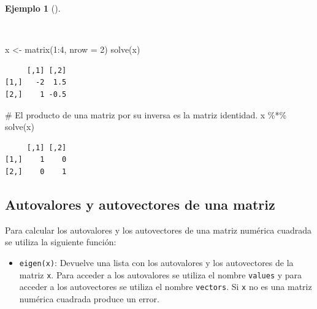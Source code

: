 \documentclass[
  spanish,
  a4paper,
]{scrreport}
\newenvironment{Shaded}{\begin{snugshade}}{\end{snugshade}}
\newcommand{\AttributeTok}[1]{\textcolor[rgb]{0.40,0.45,0.13}{#1}}
\newcommand{\CommentTok}[1]{\textcolor[rgb]{0.37,0.37,0.37}{#1}}
\newcommand{\DecValTok}[1]{\textcolor[rgb]{0.68,0.00,0.00}{#1}}
\newcommand{\FunctionTok}[1]{\textcolor[rgb]{0.28,0.35,0.67}{#1}}
\newcommand{\NormalTok}[1]{\textcolor[rgb]{0.00,0.23,0.31}{#1}}
\newcommand{\OtherTok}[1]{\textcolor[rgb]{0.00,0.23,0.31}{#1}}
\newcommand{\SpecialCharTok}[1]{\textcolor[rgb]{0.37,0.37,0.37}{#1}}
\providecommand{\tightlist}{%
  \setlength{\itemsep}{0pt}\setlength{\parskip}{0pt}}
\theoremstyle{definition}
\theoremstyle{definition}
\newtheorem{example}{Ejemplo}[chapter]
\theoremstyle{remark}
\begin{document}
\begin{example}[]\protect\hypertarget{exm-inversa-matriz}{}\label{exm-inversa-matriz}

~

\begin{Shaded}
\begin{Highlighting}[]
\NormalTok{x }\OtherTok{\textless{}{-}} \FunctionTok{matrix}\NormalTok{(}\DecValTok{1}\SpecialCharTok{:}\DecValTok{4}\NormalTok{, }\AttributeTok{nrow =} \DecValTok{2}\NormalTok{)}
\FunctionTok{solve}\NormalTok{(x)}
\end{Highlighting}
\end{Shaded}

\begin{verbatim}
     [,1] [,2]
[1,]   -2  1.5
[2,]    1 -0.5
\end{verbatim}

\begin{Shaded}
\begin{Highlighting}[]
\CommentTok{\# El producto de una matriz por su inversa es la matriz identidad.}
\NormalTok{x }\SpecialCharTok{\%*\%} \FunctionTok{solve}\NormalTok{(x)}
\end{Highlighting}
\end{Shaded}

\begin{verbatim}
     [,1] [,2]
[1,]    1    0
[2,]    0    1
\end{verbatim}

\end{example}

\subsection{Autovalores y autovectores de una
matriz}\label{autovalores-y-autovectores-de-una-matriz}

Para calcular los autovalores y los autovectores de una matriz numérica
cuadrada se utiliza la siguiente función:

\begin{itemize}
\tightlist
\item
  \texttt{eigen(x)}: Devuelve una lista con los autovalores y los
  autovectores de la matriz \texttt{x}. Para acceder a los autovalores
  se utiliza el nombre \texttt{values} y para acceder a los autovectores
  se utiliza el nombre \texttt{vectors}. Si \texttt{x} no es una matriz
  numérica cuadrada produce un error.
\end{itemize}
\end{document}
